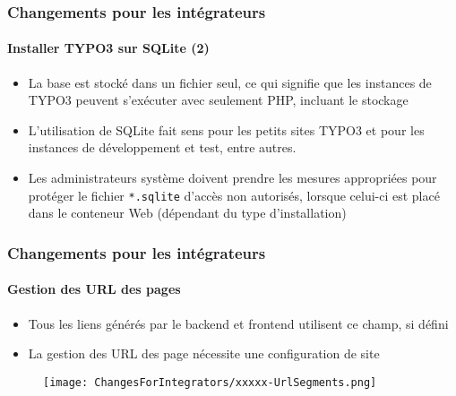 \begin{frame}[fragile]
	\frametitle{Changements pour les intégrateurs}
	\framesubtitle{Installer TYPO3 sur SQLite (2)}

	\begin{itemize}
		\item La base est stocké dans un fichier seul, ce qui signifie que les
			instances de TYPO3 peuvent s'exécuter avec seulement PHP, incluant le stockage
		\item L'utilisation de SQLite fait sens pour les petits sites TYPO3 et
			pour les instances de développement et test, entre autres.
		\item Les administrateurs système doivent prendre les mesures appropriées
			pour protéger le fichier \texttt{*.sqlite} d'accès non autorisés, lorsque
			celui-ci est placé dans le conteneur Web (dépendant du type d'installation)
	\end{itemize}

\end{frame}


\begin{frame}[fragile]
	\frametitle{Changements pour les intégrateurs}
	\framesubtitle{Gestion des URL des pages}

	\begin{itemize}
		\item Tous les liens générés par le backend et frontend utilisent ce champ,
			si défini
		\item La gestion des URL des page nécessite une configuration de site
	\end{itemize}

	\begin{figure}
		\texttt{[image: ChangesForIntegrators/xxxxx-UrlSegments.png]}
	\end{figure}

\end{frame}


